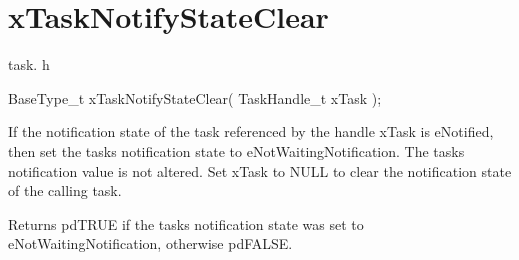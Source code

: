 \hypertarget{group__xTaskNotifyStateClear}{}\section{x\+Task\+Notify\+State\+Clear}
\label{group__xTaskNotifyStateClear}
task. h 
\begin{DoxyPre}BaseType\_t xTaskNotifyStateClear( TaskHandle\_t xTask );\end{DoxyPre}


If the notification state of the task referenced by the handle x\+Task is e\+Notified, then set the task\textquotesingle{}s notification state to e\+Not\+Waiting\+Notification. The task\textquotesingle{}s notification value is not altered. Set x\+Task to N\+U\+LL to clear the notification state of the calling task.

\begin{DoxyReturn}{Returns}
pd\+T\+R\+UE if the task\textquotesingle{}s notification state was set to e\+Not\+Waiting\+Notification, otherwise pd\+F\+A\+L\+SE. 
\end{DoxyReturn}
